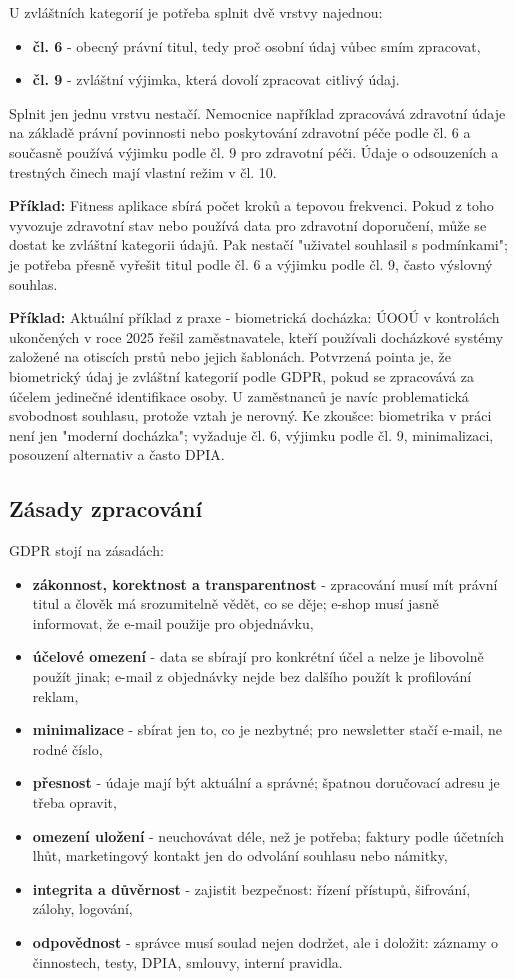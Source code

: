 \documentclass[11pt,a4paper]{article}
\newcommand{\priklad}[1]{\begin{tcolorbox}[breakable,enhanced,colback=green!7,colframe=green!30!black,boxrule=0pt,arc=1mm,left=5pt,right=5pt,top=5pt,bottom=5pt,before skip=6pt,after skip=6pt]\textbf{Příklad:} #1\end{tcolorbox}}
\begin{document}
U zvláštních kategorií je potřeba splnit dvě vrstvy najednou:
\begin{itemize}
  \item \textbf{čl. 6} - obecný právní titul, tedy proč osobní údaj vůbec smím zpracovat,
  \item \textbf{čl. 9} - zvláštní výjimka, která dovolí zpracovat citlivý údaj.
\end{itemize}
Splnit jen jednu vrstvu nestačí. Nemocnice například zpracovává zdravotní údaje na základě právní povinnosti nebo poskytování zdravotní péče podle čl. 6 a současně používá výjimku podle čl. 9 pro zdravotní péči. Údaje o odsouzeních a trestných činech mají vlastní režim v čl. 10.

\priklad{Fitness aplikace sbírá počet kroků a tepovou frekvenci. Pokud z toho vyvozuje zdravotní stav nebo používá data pro zdravotní doporučení, může se dostat ke zvláštní kategorii údajů. Pak nestačí "uživatel souhlasil s podmínkami"; je potřeba přesně vyřešit titul podle čl. 6 a výjimku podle čl. 9, často výslovný souhlas.}

\priklad{Aktuální příklad z praxe - biometrická docházka: ÚOOÚ v kontrolách ukončených v roce 2025 řešil zaměstnavatele, kteří používali docházkové systémy založené na otiscích prstů nebo jejich šablonách. Potvrzená pointa je, že biometrický údaj je zvláštní kategorií podle GDPR, pokud se zpracovává za účelem jedinečné identifikace osoby. U zaměstnanců je navíc problematická svobodnost souhlasu, protože vztah je nerovný. Ke zkoušce: biometrika v práci není jen "moderní docházka"; vyžaduje čl. 6, výjimku podle čl. 9, minimalizaci, posouzení alternativ a často DPIA.}

\subsection*{Zásady zpracování}
GDPR stojí na zásadách:
\begin{itemize}
  \item \textbf{zákonnost, korektnost a transparentnost} - zpracování musí mít právní titul a člověk má srozumitelně vědět, co se děje; e-shop musí jasně informovat, že e-mail použije pro objednávku,
  \item \textbf{účelové omezení} - data se sbírají pro konkrétní účel a nelze je libovolně použít jinak; e-mail z objednávky nejde bez dalšího použít k profilování reklam,
  \item \textbf{minimalizace} - sbírat jen to, co je nezbytné; pro newsletter stačí e-mail, ne rodné číslo,
  \item \textbf{přesnost} - údaje mají být aktuální a správné; špatnou doručovací adresu je třeba opravit,
  \item \textbf{omezení uložení} - neuchovávat déle, než je potřeba; faktury podle účetních lhůt, marketingový kontakt jen do odvolání souhlasu nebo námitky,
  \item \textbf{integrita a důvěrnost} - zajistit bezpečnost: řízení přístupů, šifrování, zálohy, logování,
  \item \textbf{odpovědnost} - správce musí soulad nejen dodržet, ale i doložit: záznamy o činnostech, testy, DPIA, smlouvy, interní pravidla.
\end{itemize}
\end{document}

